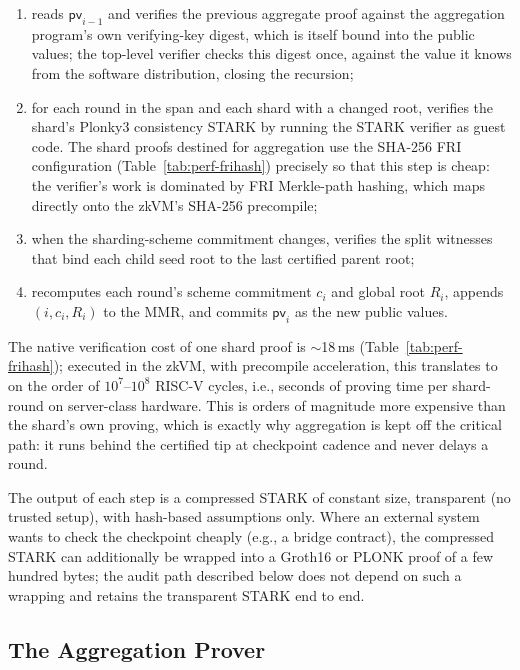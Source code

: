 \documentclass[twocolumn]{article}
\begin{document}
\begin{enumerate}[nosep]
  \item reads $\mathsf{pv}_{i-1}$ and verifies the previous aggregate proof against the aggregation program's own verifying-key digest, which is itself bound into the public values; the top-level verifier checks this digest once, against the value it knows from the software distribution, closing the recursion;
  \item for each round in the span and each shard with a changed root, verifies the shard's Plonky3 consistency STARK by running the STARK verifier as guest code. The shard proofs destined for aggregation use the SHA-256 FRI configuration (Table~\ref{tab:perf-frihash}) precisely so that this step is cheap: the verifier's work is dominated by FRI Merkle-path hashing, which maps directly onto the zkVM's SHA-256 precompile;
  \item when the sharding-scheme commitment changes, verifies the split witnesses that bind each child seed root to the last certified parent root;
  \item recomputes each round's scheme commitment $c_i$ and global root $R_i$, appends $(i,c_i,R_i)$ to the MMR, and commits $\mathsf{pv}_i$ as the new public values.
\end{enumerate}

The native verification cost of one shard proof is $\sim$18\,ms (Table~\ref{tab:perf-frihash}); executed in the zkVM, with precompile acceleration, this translates to on the order of $10^7$--$10^8$ RISC-V cycles, i.e., seconds of proving time per shard-round on server-class hardware. This is orders of magnitude more expensive than the shard's own proving, which is exactly why aggregation is kept off the critical path: it runs behind the certified tip at checkpoint cadence and never delays a round.

The output of each step is a compressed STARK of constant size, transparent (no trusted setup), with hash-based assumptions only. Where an external system wants to check the checkpoint cheaply (e.g., a bridge contract), the compressed STARK can additionally be wrapped into a Groth16 or PLONK proof of a few hundred bytes; the audit path described below does not depend on such a wrapping and retains the transparent STARK end to end.

\subsection{The Aggregation Prover}
\label{sec:aggregation-prover}
\end{document}
